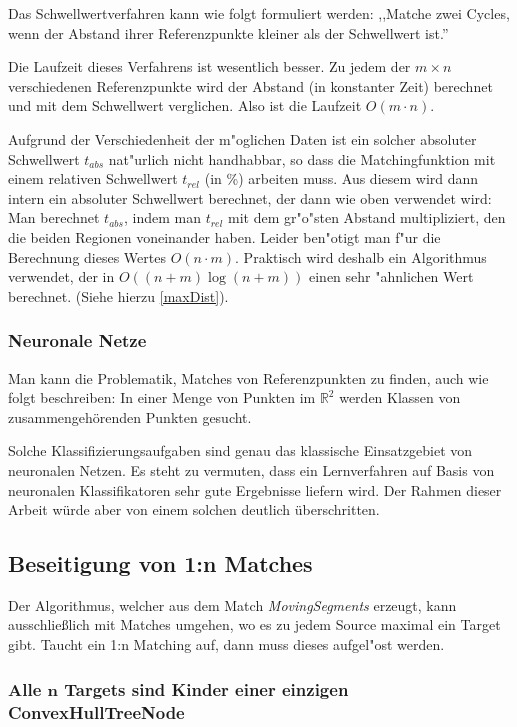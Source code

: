 Das Schwellwertverfahren kann wie folgt formuliert werden: ,,Matche zwei Cycles, wenn der Abstand ihrer Referenzpunkte kleiner als der Schwellwert ist.''

Die Laufzeit dieses Verfahrens ist wesentlich besser. Zu jedem der $m\times n$ verschiedenen  Referenzpunkte wird der  Abstand (in konstanter Zeit) berechnet und mit dem Schwellwert verglichen. Also ist die Laufzeit $O(m\cdot n)$.

Aufgrund der Verschiedenheit der m"oglichen Daten ist ein solcher absoluter Schwellwert $t_{abs}$ nat"urlich nicht handhabbar, so dass die Matchingfunktion mit einem relativen Schwellwert $t_{rel}$ (in \%) arbeiten muss. Aus diesem wird dann intern ein absoluter Schwellwert berechnet, der dann wie oben verwendet wird: Man berechnet $t_{abs}$, indem man $t_{rel}$ mit dem gr"o"sten Abstand multipliziert, den die beiden Regionen voneinander haben. Leider ben"otigt man f"ur die Berechnung dieses Wertes $O(n\cdot m)$. Praktisch wird deshalb ein Algorithmus verwendet, der in $O((n+m)\log{(n+m)})$ einen sehr "ahnlichen Wert berechnet. (Siehe hierzu \vref{maxDist}).

\subsubsection*{Neuronale Netze}

Man kann die Problematik, Matches von Referenzpunkten zu finden, auch wie folgt beschreiben: In einer Menge von Punkten im $\mathbb{R}^2$ werden Klassen von zusammengehörenden Punkten gesucht.

Solche Klassifizierungsaufgaben sind genau das klassische Einsatzgebiet von neuronalen Netzen. Es steht zu vermuten, dass ein Lernverfahren auf Basis von neuronalen Klassifikatoren sehr gute Ergebnisse liefern wird. Der Rahmen dieser Arbeit würde aber von einem solchen deutlich überschritten.

\subsection{Beseitigung von 1:n Matches}\label{1zuN}

Der Algorithmus, welcher aus dem Match \textit{MovingSegments} erzeugt, kann ausschließlich mit Matches umgehen, wo es zu jedem Source maximal ein Target gibt. Taucht ein 1:n Matching auf, dann muss dieses aufgel"ost werden. 

\subsubsection*{Alle $\mathbf{n}$ Targets sind Kinder einer einzigen ConvexHullTreeNode}\label{JoinConc}

